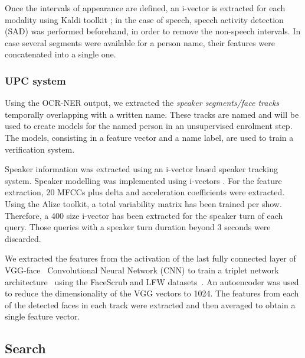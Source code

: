  Once the intervals of appearance are defined, an i-vector \cite{dehak10} is extracted for each modality using Kaldi toolkit \cite{kaldi}; in the case of speech, speech activity detection (SAD) was performed beforehand, in order to remove the non-speech intervals. In case several segments were available for a person name, their features were concatenated into a single one.

\subsubsection{UPC system}

Using the OCR-NER output, we extracted the \textit{speaker segments/face tracks} temporally overlapping with a written name. These tracks are named 
and will be used to create models for the named person in an unsupervised enrolment step. The models, consisting in a feature vector and a name label, are used to train a verification system.

Speaker information was extracted using an i-vector based speaker tracking system. 
Speaker modelling was implemented using i-vectors \cite{dehak10}. For the feature extraction, 20 MFCCs plus delta and acceleration coefficients were extracted. Using the Alize toolkit\cite{Bonastre1}, a total variability matrix has been trained per show. Therefore, a 400 size i-vector has been extracted for the speaker turn of each query. Those queries with a speaker turn duration beyond 3 seconds were discarded.

We extracted the features from the activation of the last fully connected layer of VGG-face~\cite{parkhi15deep} Convolutional Neural Network (CNN) to train a triplet network architecture~\cite{Schroff2015} using the FaceScrub and LFW datasets~\cite{huang2007lfw,ng2014data}. An autoencoder was used to reduce the dimensionality of the VGG vectors to 1024. The features from each of the detected faces in each track were extracted and then averaged to obtain a single feature vector.

\subsection{Search}

